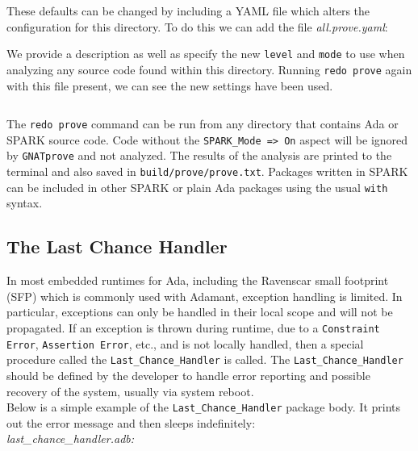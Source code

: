 These defaults can be changed by including a YAML file which alters the configuration for this directory. To do this we can add the file \textit{all.prove.yaml}:


We provide a description as well as specify the new \texttt{level} and \texttt{mode} to use when analyzing any source code found within this directory. Running \texttt{redo prove} again with this file present, we can see the new settings have been used.

\vspace{5mm} %
\inputminted{text}{../example_architecture/spark_package/output.txt}
\vspace{5mm} %

The \texttt{redo prove} command can be run from any directory that contains Ada or SPARK source code. Code without the \texttt{SPARK\_Mode => On} aspect will be ignored by \texttt{GNATprove} and not analyzed. The results of the analysis are printed to the terminal and also saved in \texttt{build/prove/prove.txt}. Packages written in SPARK can be included in other SPARK or plain Ada packages using the usual \texttt{with} syntax.


\subsection{The Last Chance Handler} \label{The Last Chance Handler}

In most embedded runtimes for Ada, including the Ravenscar small footprint (SFP) which is commonly used with Adamant, exception handling is limited. In particular, exceptions can only be handled in their local scope and will not be propagated. If an exception is thrown during runtime, due to a \texttt{Constraint Error}, \texttt{Assertion Error}, etc., and is not locally handled, then a special procedure called the \texttt{Last\_Chance\_Handler} is called. The \texttt{Last\_Chance\_Handler} should be defined by the developer to handle error reporting and possible recovery of the system, usually via system reboot. \\

Below is a simple example of the \texttt{Last\_Chance\_Handler} package body. It prints out the error message and then sleeps indefinitely: \\

\textit{last\_chance\_handler.adb:}

